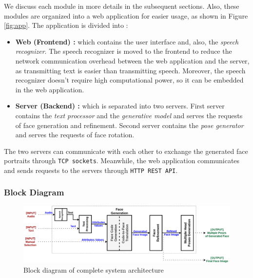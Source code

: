 We discuss each module in more details in the subsequent sections. Also, these modules are organized into a web application for easier usage, as shown in Figure \ref{fig:app}. The application is divided into :
\begin{itemize}
    \item\textbf{ Web (Frontend) :} which contains the user interface and, also, the \emph{speech recognizer}. The speech recognizer is moved to the frontend to reduce the network communication overhead between the web application and the server, as transmitting text is easier than transmitting speech. Moreover, the speech recognizer doesn't require high computational power, so it can be embedded in the web application.
    \item \textbf{Server (Backend) :} which is separated into two servers. First server contains the \emph{text processor} and the \emph{generative model} and serves the requests of face generation and refinement. Second server contains the \emph{pose generator} and serves the requests of face rotation.
\end{itemize}

The two servers can communicate with each other to exchange the generated face portraits through \texttt{TCP sockets}. Meanwhile, the web application communicates and sends requests to the servers through \texttt{HTTP REST API}.

\subsubsection{Block Diagram}

\begin{figure}[H]
    \centering
    \includegraphics[width=\textwidth]{images/system-design.png}
    \caption{Block diagram of complete system architecture}
    \label{fig:system}
\end{figure}

